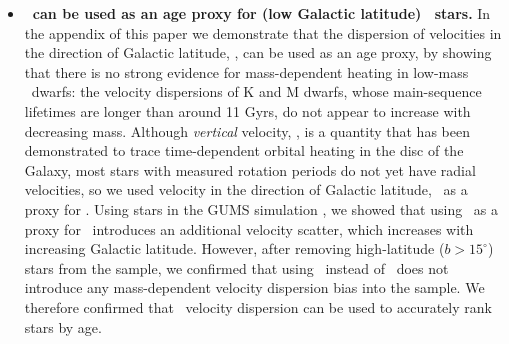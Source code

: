 \begin{itemize}
\item{{\bf \sigmavb\ can be used as an age proxy for (low Galactic latitude)
    \kepler\ stars.} In the appendix of this paper we demonstrate that the
        dispersion of velocities in the direction of Galactic latitude, \vb,
        can be used as an age proxy, by showing that there is no strong
        evidence for mass-dependent heating in low-mass \kepler\ dwarfs: the
        velocity dispersions of K and M dwarfs, whose main-sequence lifetimes
        are longer than around 11 Gyrs, do not appear to increase with
        decreasing mass.
Although {\it vertical} velocity, \vz, is a quantity that has been
demonstrated to trace time-dependent orbital heating in the disc of the
Galaxy, most stars with measured rotation periods do not yet have radial
velocities, so we used velocity in the direction of Galactic latitude, \vb\,
as a proxy for \vz.
        Using stars in the GUMS simulation \citep{robin2012}, we showed that
        using \vb\ as a proxy for \vz\ introduces an additional
        velocity scatter, which increases with increasing Galactic
        latitude.
However, after removing high-latitude ($b>15^\circ$) stars from the sample, we
confirmed that using \vb\ instead of \vz\ does not introduce any
mass-dependent velocity dispersion bias into the sample.
We therefore confirmed that \vb\ velocity dispersion can be used to accurately
rank stars by age.}

\end{itemize}
